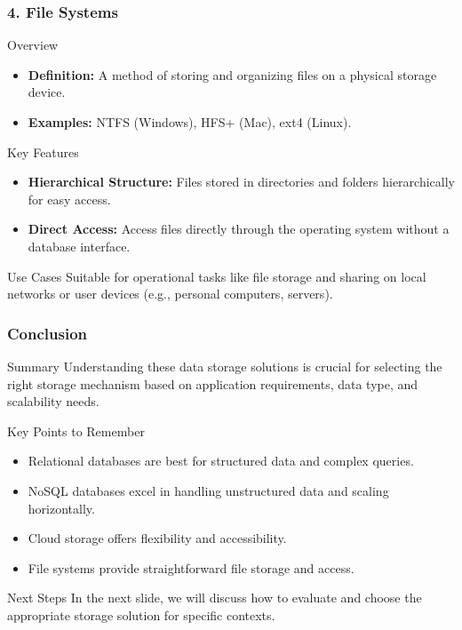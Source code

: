 \documentclass[aspectratio=169]{beamer}
\begin{document}
\begin{frame}[fragile]
    \frametitle{4. File Systems}
    \begin{block}{Overview}
        \begin{itemize}
            \item \textbf{Definition:} A method of storing and organizing files on a physical storage device.
            \item \textbf{Examples:} NTFS (Windows), HFS+ (Mac), ext4 (Linux).
        \end{itemize}
    \end{block}

    \begin{block}{Key Features}
        \begin{itemize}
            \item \textbf{Hierarchical Structure:} Files stored in directories and folders hierarchically for easy access.
            \item \textbf{Direct Access:} Access files directly through the operating system without a database interface.
        \end{itemize}
    \end{block}

    \begin{block}{Use Cases}
        Suitable for operational tasks like file storage and sharing on local networks or user devices (e.g., personal computers, servers).
    \end{block}
\end{frame}

\begin{frame}[fragile]
    \frametitle{Conclusion}
    \begin{block}{Summary}
        Understanding these data storage solutions is crucial for selecting the right storage mechanism based on application requirements, data type, and scalability needs.
    \end{block}

    \begin{block}{Key Points to Remember}
        \begin{itemize}
            \item Relational databases are best for structured data and complex queries.
            \item NoSQL databases excel in handling unstructured data and scaling horizontally.
            \item Cloud storage offers flexibility and accessibility.
            \item File systems provide straightforward file storage and access.
        \end{itemize}
    \end{block}

    \begin{block}{Next Steps}
        In the next slide, we will discuss how to evaluate and choose the appropriate storage solution for specific contexts.
    \end{block}
\end{frame}
\end{document}
